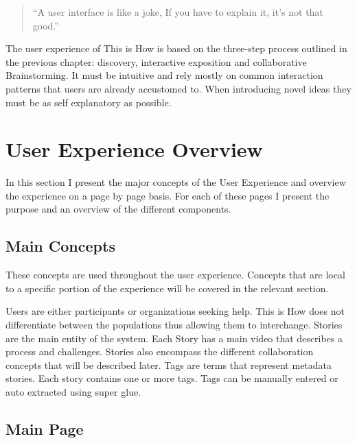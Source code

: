 \begin{quotation}
``A user interface is like a joke, If you have to explain it, it's not that good.''
\end{quotation}


The user experience of This is How is based on the three-step process outlined in the previous chapter: discovery, interactive exposition and collaborative Brainstorming. It must be intuitive and rely mostly on common interaction patterns that users are already accustomed to. When introducing novel ideas they must be as self explanatory as possible. 

\section{User Experience Overview}

In this section I present the major concepts of the User Experience and overview the experience on a page by page basis. For each of these pages I present the purpose and an overview of the different components. 

\subsection{Main Concepts}

These concepts are used throughout the user experience. Concepts that are local to a specific portion of the experience will be covered in the relevant section.

Users are either participants or organizations seeking help. This is How does not differentiate between the populations thus allowing them to interchange.
Stories are the main entity of the system. Each Story has a main video that describes a process and challenges. Stories also encompass the different collaboration concepts that will be described later.
Tags are terms that represent metadata stories. Each story contains one or more tags. Tags can be manually entered or auto extracted using super glue. 

\subsection{Main Page}

